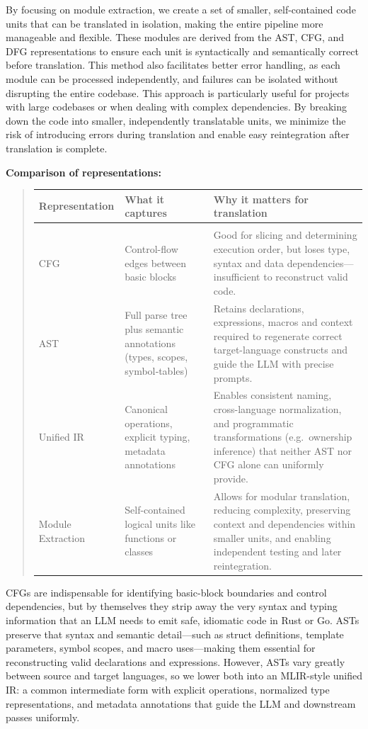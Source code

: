 \documentclass[twocolumn]{article}
\begin{document}
By focusing on module extraction, we create a set of smaller, self-contained code units that can be translated in isolation, making the entire pipeline more manageable and flexible. These modules are derived from the AST, CFG, and DFG representations to ensure each unit is syntactically and semantically correct before translation. This method also facilitates better error handling, as each module can be processed independently, and failures can be isolated without disrupting the entire codebase.
This approach is particularly useful for projects with large codebases or when dealing with complex dependencies. By breaking down the code into smaller, independently translatable units, we minimize the risk of introducing errors during translation and enable easy reintegration after translation is complete.

\medskip
\noindent\textbf{Comparison of representations:}
\begin{table}[htbp]
\begin{quote}
\begin{tabular}{p{3cm}p{5cm}p{7cm}}
\bf Representation & \bf What it captures & \bf Why it matters for translation \\\hline
\\
CFG & Control-flow edges between basic blocks  
 & Good for slicing and determining execution order, but loses type, syntax and data dependencies—insufficient to reconstruct valid code. \\
AST & Full parse tree plus semantic annotations (types, scopes, symbol‐tables)  
 & Retains declarations, expressions, macros and context required to regenerate correct target-language constructs and guide the LLM with precise prompts. \\
Unified IR & Canonical operations, explicit typing, metadata annotations  
 & Enables consistent naming, cross-language normalization, and programmatic transformations (e.g.\ ownership inference) that neither AST nor CFG alone can uniformly provide. \\
Module Extraction & Self-contained logical units like functions or classes  
 & Allows for modular translation, reducing complexity, preserving context and dependencies within smaller units, and enabling independent testing and later reintegration. \\
\end{tabular}
\end{quote}
\end{table}

\medskip
\noindent
CFGs are indispensable for identifying basic-block boundaries and control dependencies, but by themselves they strip away the very syntax and typing information that an LLM needs to emit safe, idiomatic code in Rust or Go.  ASTs preserve that syntax and semantic detail—such as struct definitions, template parameters, symbol scopes, and macro uses—making them essential for reconstructing valid declarations and expressions. However, ASTs vary greatly between source and target languages, so we lower both into an MLIR-style unified IR: a common intermediate form with explicit operations, normalized type representations, and metadata annotations that guide the LLM and downstream passes uniformly.  
\end{document}
